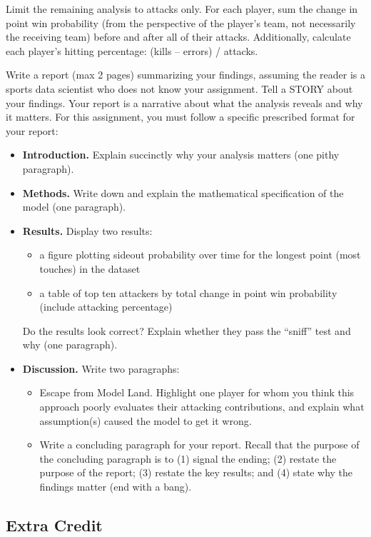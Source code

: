 \documentclass{article}
\begin{document}
      Limit the remaining analysis to attacks only. For each player, sum the change in point win probability (from the perspective of the player's team, not necessarily the receiving team) before and after all of their attacks. Additionally, calculate each player's hitting percentage: (kills -- errors) / attacks.

      Write a report (max 2 pages) summarizing your findings, assuming the reader is a sports data scientist who does not know your assignment. Tell a STORY about your findings. Your report is a narrative about what the analysis reveals and why it matters. For this assignment, you must follow a specific prescribed format for your report:
      \begin{itemize}
        \item {\bf Introduction.} Explain succinctly why your analysis matters (one pithy paragraph).
        \item {\bf Methods.} Write down and explain the mathematical specification of the model (one paragraph).
        \item {\bf Results.} Display two results:
        \begin{itemize}
          \item a figure plotting sideout probability over time for the longest point (most touches) in the dataset
          \item a table of top ten attackers by total change in point win probability (include attacking percentage)
        \end{itemize}
        Do the results look correct? Explain whether they pass the ``sniff'' test and why (one paragraph).
        \item {\bf Discussion.} Write two paragraphs:
        \begin{itemize}
          \item Escape from Model Land. Highlight one player for whom you think this approach poorly evaluates their attacking contributions, and explain what assumption(s) caused the model to get it wrong.
          \item Write a concluding paragraph for your report. Recall that the purpose of the concluding paragraph is to (1) signal the ending; (2) restate the purpose of the report; (3) restate the key results; and (4) state why the findings matter (end with a bang).
        \end{itemize}
      \end{itemize}

      \subsection*{\sc Extra Credit}
\end{document}
